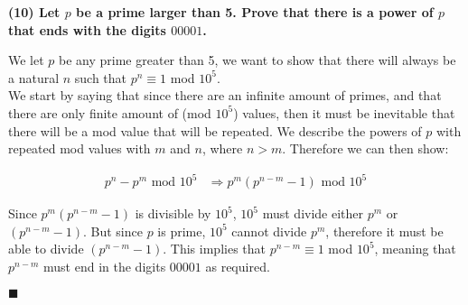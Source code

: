 \documentclass[20pt]{article}
\begin{document}
\noindent
\textbf{(10) Let $p$ be a prime larger than 5. Prove that there is a power of $p$ that ends with the digits $00001$.}\\
\begin{text}
    \noindent
    We let $p$ be any prime greater than 5, we want to show that there will always be a natural $n$ such that $p^n \equiv 1$ mod $10^5$.\\
    
    \noindent
    We start by saying that since there are an infinite amount of primes, and that there are only finite amount of (mod $10^5$) values, then it must be inevitable that there will be a mod value that will be repeated. We describe the powers of $p$ with repeated mod values with $m$ and $n$, where $n > m$. Therefore we can then show:
    
    \begin{align}
        p^n - p^m \text{ mod } 10^5 &\Longrightarrow p^m(p^{n-m} - 1) \text{ mod } 10^5\nonumber
    \end{align}
    
    \noindent
    Since $p^m(p^{n-m} - 1)$ is divisible by $10^5$, $10^5$ must divide either $p^m$ or $(p^{n-m} - 1)$. But since $p$ is prime, $10^5$ cannot divide $p^m$, therefore it must be able to divide $(p^{n-m} - 1)$. This implies that $p^{n-m} \equiv 1$ mod $10^5$, meaning that $p^{n-m}$ must end in the digits $00001$ as required.
    
    \hfill $\blacksquare$
\end{text}\\
\end{document}
